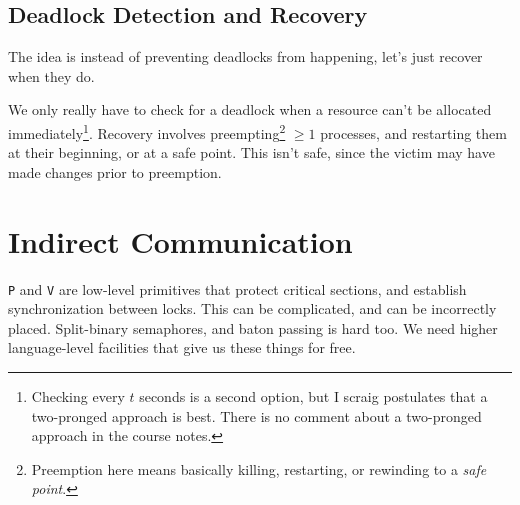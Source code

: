        \section{Deadlock Detection and Recovery} %
        \label{sec:deadlock_detection_and_recovery}
            The idea is instead of preventing deadlocks from happening, let's just recover when they do.

            We only really have to check for a deadlock when a resource can't be allocated immediately\footnote{Checking every $t$ seconds is a second option, but I scraig postulates that a two-pronged approach is best. There is no comment about a two-pronged approach in the course notes.}.
            Recovery involves preempting\footnote{Preemption here means basically killing, restarting, or rewinding to a \textit{safe point}.} $\ge1$ processes, and restarting them at their beginning, or at a safe point.
            This isn't safe, since the victim may have made changes prior to preemption.
    \chapter{Indirect Communication} %
    \label{cha:indirect_communication}
        \verb|P| and \verb|V| are low-level primitives that protect critical sections, and establish synchronization between locks.
        This can be complicated, and can be incorrectly placed.
        Split-binary semaphores, and baton passing is hard too.
        We need higher language-level facilities that give us these things for free.
